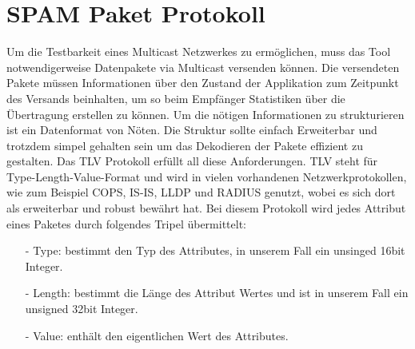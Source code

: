 \section{SPAM Paket Protokoll}

Um die Testbarkeit eines Multicast Netzwerkes zu ermöglichen, muss das Tool notwendigerweise
Datenpakete via Multicast versenden können. Die versendeten Pakete müssen Informationen über den
Zustand der Applikation zum Zeitpunkt des Versands beinhalten, um so beim Empfänger
Statistiken über die Übertragung erstellen zu können. Um die nötigen Informationen
zu strukturieren ist ein Datenformat von Nöten. Die Struktur sollte einfach
Erweiterbar und trotzdem simpel gehalten sein um das Dekodieren der Pakete 
effizient zu gestalten. Das TLV Protokoll erfüllt all diese Anforderungen.
TLV steht für Type-Length-Value-Format und wird in vielen vorhandenen 
Netzwerkprotokollen, wie zum Beispiel COPS, IS-IS, LLDP und RADIUS genutzt,
wobei es sich dort als erweiterbar und robust bewährt hat.
Bei diesem Protokoll wird jedes Attribut eines Paketes durch folgendes Tripel übermittelt:

\begin{itemize}
 \item[-] Type: bestimmt den Typ des Attributes, in unserem Fall ein unsinged 
                16bit Integer.
 \item[-] Length: bestimmt die Länge des Attribut Wertes und ist 
                  in unserem Fall ein unsigned 32bit Integer.
 \item[-] Value: enthält den eigentlichen Wert des Attributes.
\end{itemize}

